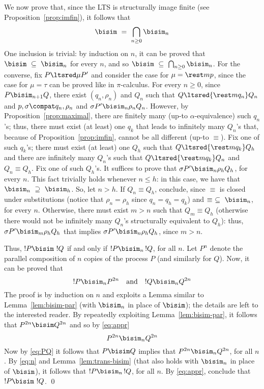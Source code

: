 \documentclass{LMCS}
\begin{document}
We now prove that, since the LTS is structurally image finite (see Proposition~\ref{prop:imfin}),
it follows that
\begin{equation}
\label{eq:appr}
\bisim\ =\ \bigcap_{n \geq 0} \bisim_n
\end{equation}
One inclusion is trivial: by induction on $n$, it can be proved that $\bisim\ \subseteq\ \bisim_n$ for every $n$,
and so $\bisim\ \subseteq\ \bigcap_{n \geq 0} \bisim_n$.
For the converse, fix $P \ltsred\mu P'$ and consider the case for $\mu = \rest m p$, since
the case for $\mu = \tau$ can be proved like in $\pi$-calculus. For every $n \geq 0$, since $P \bisim_{n+1} Q$, 
there exist $(q_n,\rho_n)$ and $Q_n$ such that $Q \ltsred{\rest m q_n} Q_n$ and $p,\sigma \compat q_n,\rho_n$
and $\sigma P' \bisim_n \rho_n Q_n$. However, by Proposition~\ref{prop:maximal}, 
there are finitely many (up-to $\alpha$-equivalence) such $q_n$'s; thus, there must exist
(at least) one $q_k$ that leads to infinitely many $Q_n$'s that, because of Proposition~\ref{prop:imfin},
cannot be all different (up-to $\equiv$). Fix one of such $q_k$'s; there must exist (at least) one $Q_h$ 
such that $Q\ltsred{\rest m q_k} Q_h$ and there are infinitely many $Q_n$'s such that 
$Q\ltsred{\rest m q_k} Q_n$ and $Q_n \equiv Q_h$. Fix one of such $Q_h$'s. It suffices to prove that
$\sigma P' \bisim_n \rho_h Q_h$, for every $n$. This fact trivially holds whenever $n \leq h$:
in this case, we have that $\bisim_n\ \supseteq\ \bisim_h$. So, let $n > h$. If $Q_n \equiv Q_h$,
conclude, since $\equiv$ is closed under substitutions (notice that $\rho_n = \rho_h$ since
$q_n = q_h = q_k$) and $\equiv\ \subseteq\ \bisim_n$, for every $n$. 
Otherwise, there must exist $m > n$ such that $Q_m \equiv Q_h$ 
(otherwise there would not be infinitely many $Q_n$'s structurally equivalent to $Q_h$): 
thus, $\sigma P' \bisim_m \rho_h Q_h$ that implies $\sigma P' \bisim_n \rho_h Q_h$, since $m > n$.

\medskip

Thus, $!P \bisim\,\, !Q$ if and only if $!P \bisim_n \,!Q$, for all $n$.
Let $P^n$ denote the parallel composition of $n$ copies of the process $P$ (and similarly for $Q$).
Now, it can be proved that
\begin{equation}
\label{eq:n}
!P \bisim_n P^{2n} \quad\mbox{and}\quad !Q \bisim_n Q^{2n}
\end{equation}
The proof is by induction on $n$ and exploits a Lemma similar to Lemma~\ref{lem:bisim-par} (with $\bisim_n$ in
place of $\bisim$); the details are left to the interested reader.
By repeatedly exploiting Lemma~\ref{lem:bisim-par}, it follows that $P^{2n} \bisim Q^{2n}$
and so by \eqref{eq:appr}
\begin{equation}
\label{eq:PQ}
P^{2n} \bisim_n Q^{2n}
\end{equation}
Now by \eqref{eq:PQ} it follows that $P\bisim Q$ implies that $P^{2n}\bisim_n Q^{2n}$, for all $n$.
By \eqref{eq:n} and Lemma~\ref{lem:trans-bisim} (that also holds with $\bisim_n$ in place of $\bisim$),
it follows that $!P\bisim_n \,!Q$, for all $n$.
By \eqref{eq:appr}, conclude that $!P\bisim\,\, !Q$.
\qed





\end{document}
